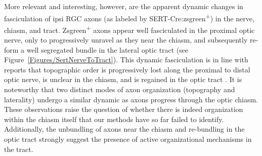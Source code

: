 More relevant and interesting, however, are the apparent dynamic changes in fasciculation of ipsi RGC axons (as labeled by SERT-Cre:zsgreen\textsuperscript{+}) in the nerve, chiasm, and tract.
Zsgreen\textsuperscript{+} axons appear well fasciculated in the proximal optic nerve, only to progressively unravel as they near the chiasm, and subsequently re-form a well segregated bundle in the lateral optic tract (see Figure~\ref{Figures/SertNerveToTract}).
This dynamic fasciculation is in line with reports that topographic order is progressively lost along the proximal to distal optic nerve, is unclear in the chiasm, and is regained in the optic tract \cite{torrealba1982studies,reh1983organization,reese1993reestablishment,chan1994changes,chan1999changes,plas2005pretarget}.
It is noteworthy that two distinct modes of axon organization (topography and laterality) undergo a similar dynamic as axons progress through the optic chiasm.
These observations raise the question of whether there is indeed organization within the chiasm itself that our methods have so far failed to identify.
Additionally, the unbundling of axons near the chiasm and re-bundling in the optic tract strongly suggest the presence of active organizational mechanisms in the tract. 